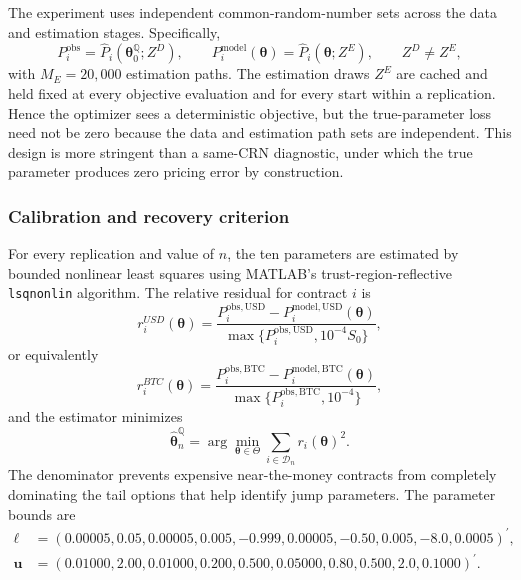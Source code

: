 The experiment uses independent common-random-number sets across the data and
estimation stages. Specifically,
\begin{equation}
P_i^{\mathrm{obs}}
=\widehat P_i(\boldsymbol{\theta}^{\mathbb Q}_0;Z^{D}),
\qquad
P_i^{\mathrm{model}}(\boldsymbol{\theta})
=\widehat P_i(\boldsymbol{\theta};Z^{E}),
\qquad Z^{D}\ne Z^{E},
\label{eq:q_independent_crn_design}
\end{equation}
with $M_E=20{,}000$ estimation paths. The estimation draws $Z^E$ are cached
and held fixed at every objective evaluation and for every start within a
replication. Hence the optimizer sees a deterministic objective, but the
true-parameter loss need not be zero because the data and estimation path sets
are independent. This design is more stringent than a same-CRN diagnostic,
under which the true parameter produces zero pricing error by construction.

\subsubsection{Calibration and recovery criterion}
\label{subsec:q_parameter_recovery_estimation}

For every replication and value of $n$, the ten parameters are estimated by
bounded nonlinear least squares using MATLAB's trust-region-reflective
\texttt{lsqnonlin} algorithm. The relative residual for contract $i$ is
\begin{equation}
r_i^{USD}(\boldsymbol{\theta})
=\frac{P_i^{\mathrm{obs, USD}}
       -P_i^{\mathrm{model, USD}}(\boldsymbol{\theta})}
       {\max\{P_i^{\mathrm{obs, USD}},10^{-4}S_0\}},
\label{eq:q_relative_residual_USD}
\end{equation}
or equivalently
\begin{equation}
r_i^{BTC}(\boldsymbol{\theta})
=\frac{P_i^{\mathrm{obs, BTC}}
       -P_i^{\mathrm{model, BTC}}(\boldsymbol{\theta})}
       {\max\{P_i^{\mathrm{obs, BTC}},10^{-4}\}},
\label{eq:q_relative_residual_BTC}
\end{equation}
and the estimator minimizes
\begin{equation}
\widehat{\boldsymbol{\theta}}_n^{\mathbb Q}
=\arg\min_{\boldsymbol{\theta}\in\Theta}
 \sum_{i\in\mathcal D_n}r_i(\boldsymbol{\theta})^2.
\label{eq:q_nonlinear_least_squares}
\end{equation}
The denominator prevents expensive near-the-money contracts from completely
dominating the tail options that help identify jump parameters. The parameter
bounds are
\begin{align*}
\boldsymbol{\ell}
&=(0.00005,0.05,0.00005,0.005,-0.999,
   0.00005,-0.50,0.005,-8.0,0.0005)^{\prime},\\
\boldsymbol{u}
&=(0.01000,2.00,0.01000,0.200,0.500,
   0.05000,0.80,0.500,2.0,0.1000)^{\prime}.
\end{align*}

